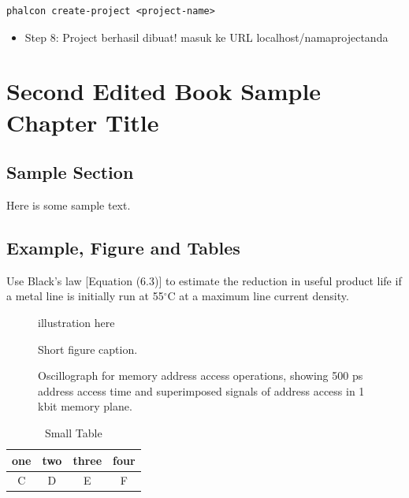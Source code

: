 \documentclass{wileySix}
\begin{document}
 \begin{verbatim}
phalcon create-project <project-name> 
\end{verbatim}
 \begin{itemize}
 \item Step 8: Project berhasil dibuat! masuk ke URL localhost/namaprojectanda
 \end{itemize}


\chapter{Second Edited Book Sample Chapter Title}

\section{Sample Section}
Here is some sample text.

\newpage

\section{Example, Figure and Tables}
\vskip6pt
\begin{example}
Use Black's law [Equation (6.3)] to estimate the reduction in useful product
life if a metal line is initially run at 55$^\circ$C at a maximum line
current density.
\end{example}




\begin{figure}[ht]
illustration here
\caption{Short figure caption.}
\end{figure}

\begin{figure}[ht]
\vskip2pt
\caption{Oscillograph for  memory address access operations,
showing 500 ps
address access time and superimposed signals
of address access in 1 kbit
memory plane.}
\end{figure}

\begin{table}[ht]
\caption{Small Table}
\centering
\begin{tabular}{cccc}
\hline
one&two&three&four\\
\hline
C&D&E&F\\
\hline
\end{tabular}
\end{table}
\end{document}
